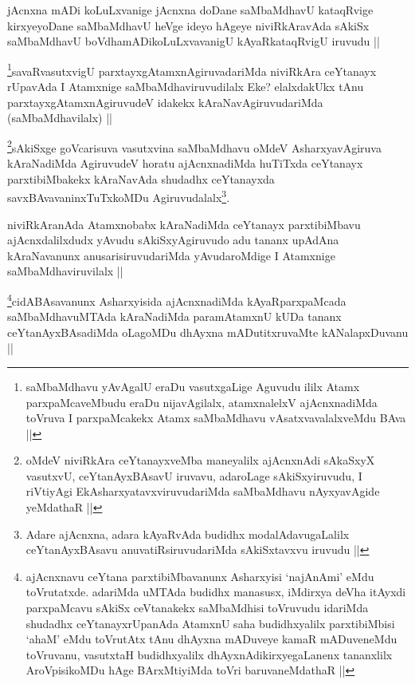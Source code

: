 \begin{artha}
jAcnxna mADi koLuLxvanige jAcnxna doDane saMbaMdhavU kataqRvige kirxyeyoDane saMbaMdhavU heVge ideyo hAgeye niviRkAravAda sAkiSx saMbaMdhavU boVdhamADikoLuLxvavanigU kAyaRkataqRvigU iruvudu ||
\end{artha}

\begin{artha}
\footnote{saMbaMdhavu yAvAgalU eraDu vasutxgaLige Aguvudu ililx Atamx parxpaMcaveMbudu eraDu nijavAgilalx, atamxnalelxV ajAcnxnadiMda toVruva I parxpaMcakekx Atamx saMbaMdhavu vAsatxvavalalxveMdu BAva ||}savaRvasutxvigU parxtayxgAtamxnAgiruvadariMda niviRkAra ceYtanayx rUpavAda I Atamxnige saMbaMdhaviruvudilalx Eke? elalxdakUkx tAnu parxtayxgAtamxnAgiruvudeV idakekx kAraNavAgiruvudariMda (saMbaMdhavilalx) ||
\end{artha}

\begin{artha}
\footnote{oMdeV niviRkAra ceYtanayxveMba maneyalilx ajAcnxnAdi sAkaSxyX vasutxvU, ceYtanAyxBAsavU iruvavu, adaroLage sAkiSxyiruvudu, I riVtiyAgi EkAsharxyatavxviruvudariMda saMbaMdhavu nAyxyavAgide yeMdathaR ||}sAkiSxge goVcarisuva vasutxvina saMbaMdhavu oMdeV AsharxyavAgiruva kAraNadiMda AgiruvudeV horatu ajAcnxnadiMda huTiTxda ceYtanayx parxtibiMbakekx kAraNavAda shudadhx ceYtanayxda savxBAvavaninxTuTxkoMDu Agiruvudalalx\footnote{Adare ajAcnxna, adara kAyaRvAda budidhx modalAdavugaLalilx ceYtanAyxBAsavu anuvatiRsiruvudariMda sAkiSxtavxvu iruvudu ||}.
\end{artha}

\begin{artha}
niviRkAranAda Atamxnobabx kAraNadiMda ceYtanayx parxtibiMbavu ajAcnxdalilxdudx yAvudu sAkiSxyAgiruvudo adu tananx upAdAna kAraNavanunx anusarisiruvudariMda yAvudaroMdige I Atamxnige saMbaMdhaviruvilalx ||
\end{artha}

\begin{artha}
\footnote{ajAcnxnavu ceYtana parxtibiMbavanunx Asharxyisi `najAnAmi' eMdu toVrutatxde. adariMda uMTAda budidhx manasusx, iMdirxya deVha itAyxdi parxpaMcavu sAkiSx ceVtanakekx saMbaMdhisi toVruvudu idariMda shudadhx ceYtanayxrUpanAda AtamxnU saha budidhxyalilx parxtibiMbisi `ahaM' eMdu toVrutAtx tAnu dhAyxna mADuveye kamaR mADuveneMdu toVruvanu, vasutxtaH budidhxyalilx dhAyxnAdikirxyegaLanenx tananxlilx AroVpisikoMDu hAge BArxMtiyiMda toVri baruvaneMdathaR ||}cidABAsavanunx Asharxyisida ajAcnxnadiMda kAyaRparxpaMcada saMbaMdhavuMTAda kAraNadiMda paramAtamxnU kUDa tananx ceYtanAyxBAsadiMda oLagoMDu dhAyxna mADutitxruvaMte kANalapxDuvanu ||
\end{artha}

